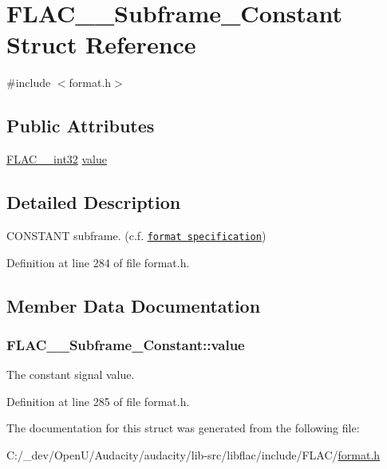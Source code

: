\hypertarget{struct_f_l_a_c_____subframe___constant}{}\section{F\+L\+A\+C\+\_\+\+\_\+\+Subframe\+\_\+\+Constant Struct Reference}
\label{struct_f_l_a_c_____subframe___constant}


{\ttfamily \#include $<$format.\+h$>$}

\subsection*{Public Attributes}
\begin{DoxyCompactItemize}
\item 
\hyperlink{ordinals_8h_a33fd77bfe6d685541a0c034a75deccdc}{F\+L\+A\+C\+\_\+\+\_\+int32} \hyperlink{struct_f_l_a_c_____subframe___constant_af1bcfcbb17f1e1edb115b002fdbaa70e}{value}
\end{DoxyCompactItemize}


\subsection{Detailed Description}
C\+O\+N\+S\+T\+A\+NT subframe. (c.\+f. \href{../format.html#subframe_constant}{\tt format specification}) 

Definition at line 284 of file format.\+h.



\subsection{Member Data Documentation}
\subsubsection[{\texorpdfstring{value}{value}}]{ F\+L\+A\+C\+\_\+\+\_\+\+Subframe\+\_\+\+Constant\+::value}\hypertarget{struct_f_l_a_c_____subframe___constant_af1bcfcbb17f1e1edb115b002fdbaa70e}{}\label{struct_f_l_a_c_____subframe___constant_af1bcfcbb17f1e1edb115b002fdbaa70e}
The constant signal value. 

Definition at line 285 of file format.\+h.



The documentation for this struct was generated from the following file\+:\begin{DoxyCompactItemize}
\item 
C\+:/\+\_\+dev/\+Open\+U/\+Audacity/audacity/lib-\/src/libflac/include/\+F\+L\+A\+C/\hyperlink{include_2_f_l_a_c_2format_8h}{format.\+h}\end{DoxyCompactItemize}
